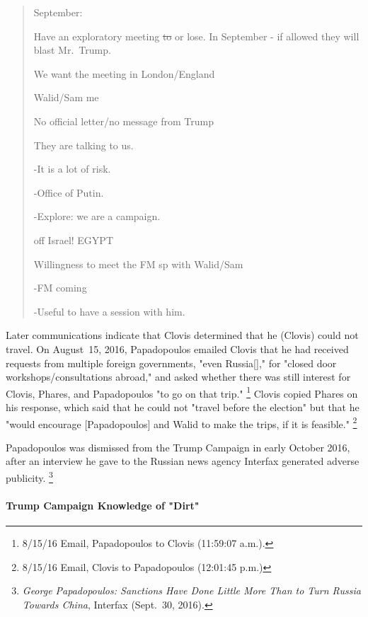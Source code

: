 \begin{quote}
September:

Have an exploratory meeting \sout{to} or lose.
In September - if allowed they will blast Mr.~Trump.

We want the meeting in London/England

Walid/Sam me

No official letter/no message from Trump

They are talking to us.

-It is a lot of risk.

-Office of Putin.

-Explore: we are a campaign.

off Israel! EGYPT

Willingness to meet the FM sp with Walid/Sam

-FM coming

-Useful to have a session with him.
\end{quote}

Later communications indicate that Clovis determined that he (Clovis) could not travel.
On August~15, 2016, Papadopoulos emailed Clovis that he had received requests from multiple foreign governments, "even Russia[]," for "closed door workshops/consultations abroad," and asked whether there was still interest for Clovis, Phares, and Papadopoulos "to go on that trip."%
\footnote{8/15/16 Email, Papadopoulos to Clovis (11:59:07 a.m.).}
Clovis copied Phares on his response, which said that he could not "travel before the election" but that he "would encourage [Papadopoulos] and Walid to make the trips, if it is feasible."%
\footnote{8/15/16 Email, Clovis to Papadopoulos (12:01:45 p.m.)}

Papadopoulos was dismissed from the Trump Campaign in early October 2016, after an interview he gave to the Russian news agency Interfax generated adverse publicity.%
\footnote{\textit{George Papadopoulos: Sanctions Have Done Little More Than to Turn Russia Towards China}, Interfax (Sept.~30, 2016).}

\paragraph{Trump Campaign Knowledge of "Dirt"}

